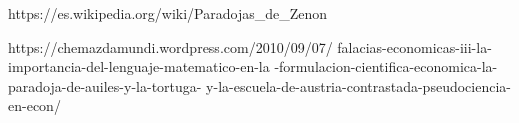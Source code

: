 \documentclass[a4paper,12pt]{article}
\begin{document}
   
   \newpage
   
   \begin{thebibliography}{99}
   
       https://es.wikipedia.org/wiki/Paradojas\_de\_Zenon
      
       https://chemazdamundi.wordpress.com/2010/09/07/
      falacias-economicas-iii-la-importancia-del-lenguaje-matematico-en-la
      -formulacion-cientifica-economica-la-paradoja-de-auiles-y-la-tortuga-
      y-la-escuela-de-austria-contrastada-pseudociencia-en-econ/
      
   \end{thebibliography}
  
\end{document}
